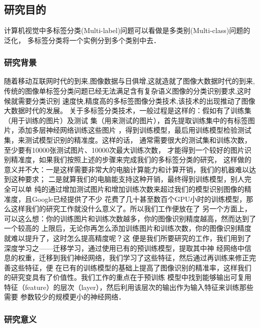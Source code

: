 \chapter{} 

\section{研究目的}
计算机视觉中多标签分类(Multi-label)问题可以看做是多类别(Multi-class)问题的泛化，
多标签分类将一个实例分到多个类别中去．
\subsection{研究背景}

随着移动互联网时代的到来,图像数据与日俱增,这就造就了图像大数据时代的到来,
传统的图像单标签分类问题已经无法满足含有复杂语义图像的分类识别要求,这时候就需要分类识别
速度快,精度高的多标签图像分类技术,该技术的出现推动了图像大数据时代的发展。
关于多标签分类技术，一般过程是这样的：假如有了训练集（用于训练的图片）及测试
集（用来测试的图片），首先提取训练集中的有标签图片，添加多层神经网络训练这些图片
，得到训练模型，最后用训练模型检验测试集，来测试模型识别的精准度。这样的话，
通常需要很大的测试集和训练次数，至少要有10000张测试图片、10000次最大训练次数，
才能得到一个较好的图片识别精准度，如果我们按照上述的步骤来完成我们的多标签分类的研究，
这样做的意义并不大：一是这样需要非常大的电脑计算能力和计算开销，我们的机器难以达到这种要求；
二是就算我们的电脑能支持这种开销，最终得到训练模型，别人完全可以单
纯的通过增加测试图片和增加训练次数来超过我们的模型识别图像的精准度，且Google已经提供了不少
花费了几十甚至数百个GPU小时的训练模型，那么这样我们的研究工作就没什么意义了。所以我们工作便放在了
另一个方面上，可以这么想：你的训练图片和训练次数越多，你的图像识别精度越高，然而达到了一个较高的
上限后，无论你再怎么添加训练图片和训练次数，你的图像识别精度就难以提升了，这时怎么提高精度呢？这
便是我们所要研究的工作，我们用到了深度学习之——迁移学习，通过使用已有的预训练模型，提取其中神
经网络中信息的权重，迁移到我们神经网络，我们学习了这些特征，然后通过再训练来修正完善这些特征，便
在已有的训练模型的基础上提高了图像识别的精准率，这样我们的研究变具有了价值性。我们工作的重点在于预训练
模型中找到能够输出可复用特征（feature）的层次（layer），然后利用该层次的输出作为输入特征来训练那些需要
参数较少的规模更小的神经网络．

\subsection{研究意义}

